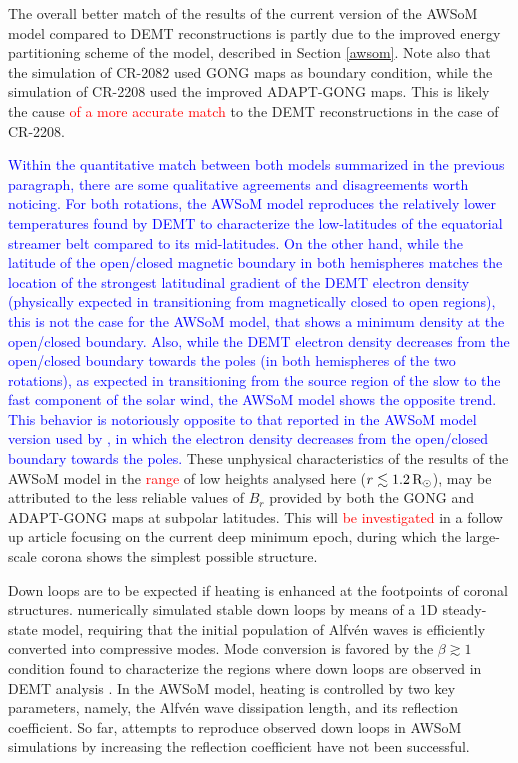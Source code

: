 \documentclass[namedreferences]{solarphysics}
\def\edit#1{\textcolor{Red}{#1}}
\def\del#1{\textcolor{Blue}{#1}}
\newcommand{\mrsun}{{\rm R_\odot}}
\begin{document}
\begin{article}
{The overall better match of the results of the current version of the AWSoM model compared to DEMT reconstructions is partly due to the improved energy partitioning scheme of the model, described in Section \ref{awsom}. Note also that the simulation of CR-2082 used GONG maps as boundary condition, while the simulation of CR-2208 used the improved ADAPT-GONG maps. This is likely the cause \edit{of a more accurate match} to the DEMT reconstructions in the case of CR-2208.}

\del{Within the {quantitative match between both {models summarized} in the previous paragraph, there are some qualitative agreements and {disagreements worth noticing}. }For both rotations, the AWSoM model reproduces the relatively lower temperatures found by DEMT to characterize the low-latitudes of the equatorial streamer belt compared to its mid-latitudes. On the other hand, while the latitude of the open/closed magnetic boundary in both hemispheres matches the location of the strongest latitudinal gradient of the DEMT electron density {(physically expected in transitioning from magnetically closed to open regions)}, this is not the case for the AWSoM model, that shows a minimum density at the open/closed boundary. Also, while the DEMT electron density decreases from the open/closed boundary towards the poles (in both hemispheres of the two rotations), {as expected in transitioning from the source region of the slow to the fast component of the solar wind}, the AWSoM model shows the opposite trend. This behavior is notoriously opposite to that reported in the AWSoM model version used by \citet{oran_2015}, in which the electron density decreases from the open/closed boundary towards the poles.} {These unphysical characteristics of the results of the AWSoM model in the \edit{range} of low heights analysed here ($r\lesssim 1.2\,\mrsun$), may be attributed to the less reliable values of $B_r$ provided by both the GONG and ADAPT-GONG maps at subpolar latitudes. This will \edit{be investigated} in a follow up article focusing on the current deep minimum epoch, during which the large-scale corona shows the simplest possible structure.}

Down loops are to be expected if heating is enhanced at the footpoints of coronal structures. \citet{schiff_2016} numerically simulated stable down loops by means of a 1D steady-state model, requiring that the initial population of Alfvén waves is efficiently converted into compressive modes. Mode conversion is favored by the $\beta\gtrsim 1 $ condition found to characterize the regions where down loops are observed in DEMT analysis \citep{nuevo_2013}. In the AWSoM model, heating is controlled by two key parameters, namely, the Alfvén wave dissipation length, and its reflection coefficient. So far, attempts to reproduce observed down loops in AWSoM simulations by increasing the reflection coefficient have not been successful.


\end{article}
\end{document}
